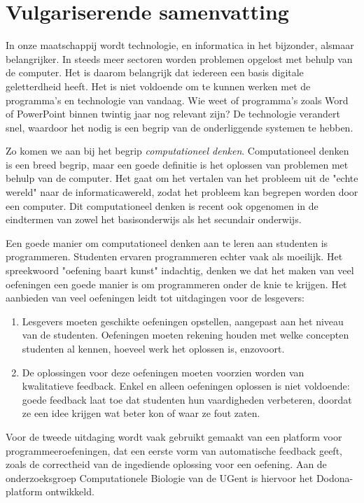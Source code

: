 \chapter*{Vulgariserende samenvatting}

In onze maatschappij wordt technologie, en informatica in het bijzonder, alsmaar belangrijker.
In steeds meer sectoren worden problemen opgelost met behulp van de computer.
Het is daarom belangrijk dat iedereen een basis digitale geletterdheid heeft.
Het is niet voldoende om te kunnen werken met de programma's en technologie van vandaag.
Wie weet of programma's zoals Word of PowerPoint binnen twintig jaar nog relevant zijn?
De technologie verandert snel, waardoor het nodig is een begrip van de onderliggende systemen te hebben.

Zo komen we aan bij het begrip \emph{computationeel denken}.
Computationeel denken is een breed begrip, maar een goede definitie is het oplossen van problemen met behulp van de computer.
Het gaat om het vertalen van het probleem uit de "echte wereld" naar de informaticawereld, zodat het probleem kan begrepen worden door een computer.
Dit computationeel denken is recent ook opgenomen in de eindtermen van zowel het basisonderwijs als het secundair onderwijs.

Een goede manier om computationeel denken aan te leren aan studenten is programmeren.
Studenten ervaren programmeren echter vaak als moeilijk.
Het spreekwoord "oefening baart kunst" indachtig, denken we dat het maken van veel oefeningen een goede manier is om programmeren onder de knie te krijgen.
Het aanbieden van veel oefeningen leidt tot uitdagingen voor de lesgevers:

\begin{enumerate}
    \item Lesgevers moeten geschikte oefeningen opstellen, aangepast aan het niveau van de studenten.
    Oefeningen moeten rekening houden met welke concepten studenten al kennen, hoeveel werk het oplossen is, enzovoort.
    \item De oplossingen voor deze oefeningen moeten voorzien worden van kwalitatieve feedback.
    Enkel en alleen oefeningen oplossen is niet voldoende: goede feedback laat toe dat studenten hun vaardigheden verbeteren, doordat ze een idee krijgen wat beter kon of waar ze fout zaten.
\end{enumerate}

Voor de tweede uitdaging wordt vaak gebruikt gemaakt van een platform voor programmeeroefeningen, dat een eerste vorm van automatische feedback geeft, zoals de correctheid van de ingediende oplossing voor een oefening.
Aan de onderzoeksgroep Computationele Biologie van de UGent is hiervoor het Dodona-platform ontwikkeld.

